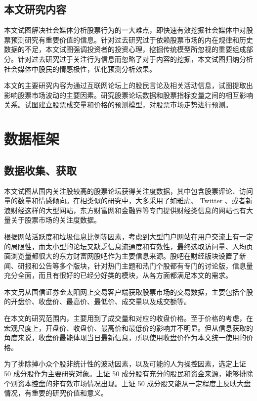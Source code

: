 \section{本文研究内容}

本文试图解决社会媒体分析股票行为的一大难点，即快速有效挖掘社会媒体中对股票预测研究有重要价值的信息。针对过去研究过于依赖股票市场的内在规律和历史数据的不足，本文试图强调投资者的投资心理，挖掘传统模型所忽视的重要组成部分。针对过去研究过于关注行为信息而忽略了对于内容的挖掘，本文试图归纳分析社会媒体中股民的情感极性，优化预测分析效果。

本文的主要研究内容为通过互联网论坛上的股民言论及相关活动信息，试图提取出影响股票市场波动的主要因素。研究股票论坛数据和股票指标变量之间的相互影响关系。试图建立股票成交量和价格的预测模型，对股票市场走势进行预测。

\chapter{数据框架}

\section{数据收集、获取}

本文试图从国内关注股较高的股票论坛获得关注度数据，其中包含股票评论、访问量的数量和情感倾向。在相类似的研究中，大多采用了如雅虎、 Twitter 、或者新浪财经这样的大型网站，东方财富网和金融界等专门提供财经类信息的网站也有大量关于股票市场的关注度数据。

根据网站活跃度和垃圾信息比例等因素，考虑到大型门户网站在用户交流上有一定的局限性，而太小型的论坛又缺乏信息流通度和有效性，最终选取访问量、人均页面浏览量都很大的东方财富网股吧作为主要信息来源。股吧在财经版块设置了新闻、研报和公告等多个版块，针对热门主题和热门个股都有专门的讨论版，信息量充分全面，而且有很好的已经分好类的模块，从各方面都满足本文的需求。

本文另从国信证券金太阳网上交易客户端获取股票市场的交易数据，主要包括个股的开盘价、收盘价、最高价、最低价、成交量以及成交额等。

在本文的研究范围内，主要用到了成交量和对应的收盘价格。至于价格的考虑，在宏观尺度上，开盘价、收盘价、最高价和最低价的影响并不明显。但从信息获取的角度来说，收盘价最能体现当日最新信息，所以使用收盘价作为本文统一使用的价格。

为了排除掉小众个股非统计性的波动因素，以及可能的人为操控因素，选定上证 50 成分股作为主要研究对象。上证 50 成分股有充分的股民和资金来源，能够排除个别资本控盘的非有效市场情况出现。上证 50 成分股又能从一定程度上反映大盘情况，有重要的研究价值和意义。

